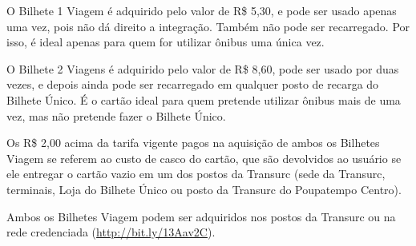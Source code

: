 O Bilhete 1 Viagem é adquirido pelo valor de R\$ 5,30, e pode ser usado apenas
uma vez, pois não dá direito a integração. Também não pode ser recarregado.  Por
isso, é ideal apenas para quem for utilizar ônibus uma única vez.

O Bilhete 2 Viagens é adquirido pelo valor de R\$ 8,60, pode ser usado por duas
vezes, e depois ainda pode ser recarregado em qualquer posto de recarga do
Bilhete Único. É o cartão ideal para quem pretende utilizar ônibus mais de uma
vez, mas não pretende fazer o Bilhete Único.

Os R\$ 2,00 acima da tarifa vigente pagos na aquisição de ambos os Bilhetes
Viagem se referem ao custo de casco do cartão, que são devolvidos ao usuário se
ele entregar o cartão vazio em um dos postos da Transurc (sede da Transurc,
terminais, Loja do Bilhete Único ou posto da Transurc do Poupatempo Centro).

Ambos os Bilhetes Viagem podem ser adquiridos nos postos da Transurc ou na rede
credenciada
(\url{http://bit.ly/13Aav2C}).
